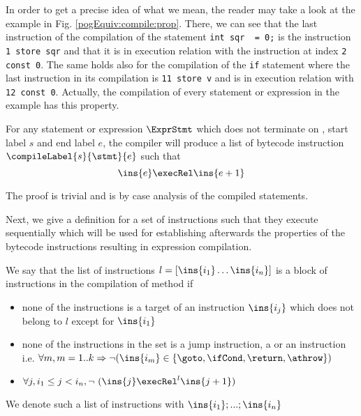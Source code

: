 In order to get a precise idea of what we mean, the reader may take a look at the example in Fig. \ref{pogEquiv:compile:prop}.
There, we can see that the last instruction of the compilation of the statement \lstinline!int sqr  = 0;! is the instruction \lstinline!1 store sqr! 
and that it is in execution relation with the instruction at index \lstinline!2 const 0!. The same holds also for the compilation of the \lstinline!if!
statement where the last instruction  in its compilation is \lstinline!11 store v! and is  in execution relation with \lstinline!12 const 0!.
Actually, the compilation of every statement or expression in the example has this property.

\begin{compProp0}\label{compile:prop:compProp0}
 For any statement or expression $\ExprStmt$ which does not terminate on \return, start label $s$ and end label $e$,
    the compiler will produce a list of bytecode instruction $\compileLabel{s}{\stmt}{e}$ such that 
     $$ \ins{e} \execRel \ins{e+1}$$
\end{compProp0}
The proof is trivial and is by case analysis of the compiled statements.


 


Next, we give a definition for a set of instructions such that they execute sequentially which will be used for 
establishing afterwards the properties of the bytecode instructions resulting in expression compilation.
 
\begin{seqInstr} \label{seqInstr}
We say that the list of instructions  $l  = \lbrack \ins{i_1} \ldots \ins{i_n} \rbrack$ is a block of instructions
 in the compilation of method \methodd{} if 
 \begin{itemize}
      \item none of the instructions is a target of an instruction $\ins{i_j}$ which does not belong to $l$ except for $\ins{i_1}$
      \item none of the instructions in the set is a jump instruction, a \return{} or an \athrow instruction
            i.e. $\forall m, m = 1..k \Rightarrow \neg( \ins{i_m} \in  \{\goto, \ifCond, \return, \athrow \} )  $ 
      \item $  \forall j, i_1 \le  j < i_n , \neg  \ ( \ins{j} \execRel^{l} \ins{j + 1} ) $ 
 \end{itemize}

We denote such a list of instructions with $\ins{i_1};...;\ins{i_n}$

\end{seqInstr}


